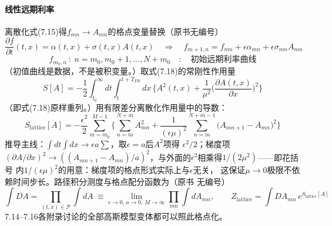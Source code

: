 \paragraph{线性远期利率}
离散化式(7.15)得$f_{mn}\to A_{mn}$的格点变量替换（原书无编号）
\begin{equation*}
\frac{\partial f}{\partial t}(t,x)=\alpha(t,x)+\sigma(t,x)A(t,x)
\quad\Longrightarrow\quad
f_{m+1,n}=f_{mn}+\epsilon\alpha_{mn}+\epsilon\sigma_{mn}A_{mn}
\end{equation*}
\begin{equation*}
f_{m_{0},n}\ :\ n=m_{0},m_{0}+1,\ldots,N+m_{0}\quad:\quad
\text{初始远期利率曲线}
\end{equation*}
（初值曲线是数据，不是被积变量。）取式(7.18)的常刚性作用量
\begin{equation*}
S[A]=-\frac{1}{2}\int_{t_{0}}^{\infty}dt\int_{t}^{t+T_{FR}}dx\,
\Biggl\{A^{2}(t,x)+\frac{1}{\mu^{2}}\biggl(\frac{\partial A(t,x)}{\partial x}
\biggr)^{2}\Biggr\}
\tag{7.91}
\end{equation*}
（即式(7.18)原样重列。）用有限差分离散化作用量中的导数：
\begin{equation*}
S_{\text{lattice}}[A]=-\frac{\epsilon^{2}}{2}\sum_{m=m_{0}}^{M-1}
\Biggl\{\sum_{n=m}^{N+m}A_{mn}^{2}
+\frac{1}{(\epsilon\mu)^{2}}\sum_{n=m}^{N+m-1}
\bigl(A_{mn+1}-A_{mn}\bigr)^{2}\Biggr\}
\tag{7.92}
\end{equation*}
推导主线：$\int dt\int dx\to\epsilon a\sum$，取$\epsilon=a$后$A^{2}$项得
$\epsilon^{2}/2$；梯度项$(\partial A/\partial x)^{2}\to((A_{mn+1}-
A_{mn})/a)^{2}$，与外面的$\epsilon^{2}$相乘得$1/(2\mu^{2})$——即花括号
内$1/(\epsilon\mu)^{2}$的用意：梯度项的格点形式实际上与$\epsilon$无关，
这保证$\mu\to0$极限不依赖时间步长。路径积分测度与格点配分函数为（原书
无编号）
\begin{equation*}
\int DA=\prod_{(t,x)\in\mathcal{P}}\int dA\ \equiv
\lim_{\epsilon\to0,\,a\to0,\,M\to\infty}\prod_{mn}\int dA_{mn},
\qquad
Z_{\text{lattice}}=\int DA_{mn}\,e^{S_{\text{lattice}}[A]}
\end{equation*}
7.14--7.16各附录讨论的全部高斯模型变体都可以照此格点化。

